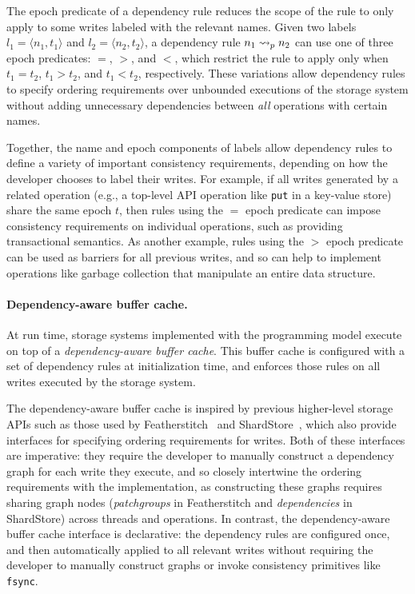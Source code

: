 The epoch predicate of a dependency rule
reduces the scope of the rule to only apply to some writes labeled with the relevant names.
Given two labels $l_1 = \langle n_1, t_1 \rangle$ and $l_2 = \langle n_2, t_2 \rangle$,
a dependency rule $\deprule{n_1}{n_2}{p}$ can use one of three epoch predicates: $=$, 
$>$, and $<$, which restrict the rule to apply only when 
$t_1 = t_2$,  $t_1 > t_2$, and $t_1 < t_2$, respectively. 
These variations allow dependency rules to specify ordering requirements over unbounded executions of the storage system
without adding unnecessary dependencies between \emph{all} operations with certain names.

Together, the name and epoch components of labels
allow dependency rules to define a variety of important consistency requirements,
depending on how the developer chooses to label their writes.
For example, if all writes generated by a related operation
(e.g., a top-level API operation like \texttt{put} in a key-value store)
share the same epoch $t$,
then rules using the $=$ epoch predicate can impose consistency requirements on individual operations,
such as providing transactional semantics.
As another example, rules using the $>$ epoch predicate
can be used as barriers for all previous writes,
and so can help to implement operations like garbage collection that manipulate an entire data structure.\tighten

\paragraph{Dependency-aware buffer cache.}
At run time,
storage systems implemented with the \depsynth programming model
execute on top of a \emph{dependency-aware buffer cache}.
This buffer cache is configured with a set of dependency rules at initialization time,
and enforces those rules on all writes executed by the storage system.

The dependency-aware buffer cache is inspired by previous higher-level storage APIs
such as those used by Featherstitch~\cite{frost:featherstitch} and ShardStore~\cite{bornholt:s3},
which also provide interfaces for specifying ordering requirements for writes.
Both of these interfaces are imperative:
they require the developer to manually construct a dependency graph for each write they execute,
and so closely intertwine the ordering requirements with the implementation,
as constructing these graphs requires sharing graph nodes 
(\emph{patchgroups} in Featherstitch
and \emph{dependencies} in ShardStore)
across threads and operations.
In contrast, the dependency-aware buffer cache interface is declarative:
the dependency rules are configured once,
and then automatically applied to all relevant writes
without requiring the developer to manually construct graphs
or invoke consistency primitives like \texttt{fsync}.

